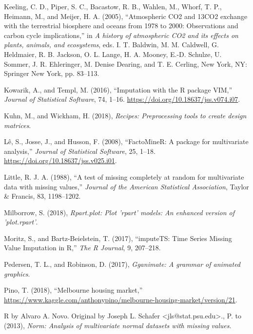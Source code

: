 \documentclass[]{article}
\theoremstyle{definition}
\theoremstyle{definition}
\theoremstyle{definition}
\theoremstyle{remark}
\begin{document}
\leavevmode\hypertarget{ref-Keeling2005-scripps}{}%
Keeling, C. D., Piper, S. C., Bacastow, R. B., Wahlen, M., Whorf, T. P.,
Heimann, M., and Meijer, H. A. (2005), ``Atmospheric CO2 and 13CO2
exchange with the terrestrial biosphere and oceans from 1978 to 2000:
Observations and carbon cycle implications,'' in \emph{A history of
atmospheric CO2 and its effects on plants, animals, and ecosystems},
eds. I. T. Baldwin, M. M. Caldwell, G. Heldmaier, R. B. Jackson, O. L.
Lange, H. A. Mooney, E.-D. Schulze, U. Sommer, J. R. Ehleringer, M.
Denise Dearing, and T. E. Cerling, New York, NY: Springer New York, pp.
83--113.

\leavevmode\hypertarget{ref-VIM}{}%
Kowarik, A., and Templ, M. (2016), ``Imputation with the R package
VIM,'' \emph{Journal of Statistical Software}, 74, 1--16.
\url{https://doi.org/10.18637/jss.v074.i07}.

\leavevmode\hypertarget{ref-recipes}{}%
Kuhn, M., and Wickham, H. (2018), \emph{Recipes: Preprocessing tools to
create design matrices}.

\leavevmode\hypertarget{ref-FactoMineR}{}%
Lê, S., Josse, J., and Husson, F. (2008), ``FactoMineR: A package for
multivariate analysis,'' \emph{Journal of Statistical Software}, 25,
1--18. \url{https://doi.org/10.18637/jss.v025.i01}.

\leavevmode\hypertarget{ref-Little1988}{}%
Little, R. J. A. (1988), ``A test of missing completely at random for
multivariate data with missing values,'' \emph{Journal of the American
Statistical Association}, Taylor \& Francis, 83, 1198--1202.

\leavevmode\hypertarget{ref-rpart-plot}{}%
Milborrow, S. (2018), \emph{Rpart.plot: Plot 'rpart' models: An enhanced
version of 'plot.rpart'}.

\leavevmode\hypertarget{ref-imputeTS}{}%
Moritz, S., and Bartz-Beielstein, T. (2017), ``imputeTS: Time Series
Missing Value Imputation in R,'' \emph{The R Journal}, 9, 207--218.

\leavevmode\hypertarget{ref-gganimate}{}%
Pedersen, T. L., and Robinson, D. (2017), \emph{Gganimate: A grammar of
animated graphics}.

\leavevmode\hypertarget{ref-kaggle2018}{}%
Pino, T. (2018), ``Melbourne housing market,''
\url{https://www.kaggle.com/anthonypino/melbourne-housing-market/version/21}.

\leavevmode\hypertarget{ref-norm}{}%
R by Alvaro A. Novo. Original by Joseph L. Schafer
\textless{}jls@stat.psu.edu\textgreater{}., P. to (2013), \emph{Norm:
Analysis of multivariate normal datasets with missing values}.
\end{document}
